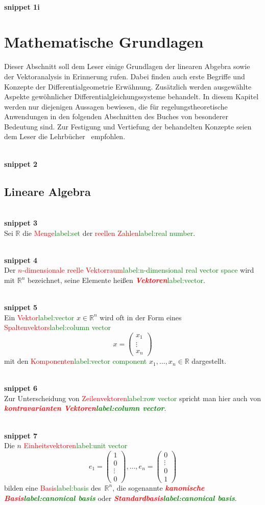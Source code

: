 \documentclass[a4paper,twoside,english,ngerman,deutsch,german,sectrefs,envcountsame,envcountchap]{svmono}
\newcommand{\setref}[2]{\textcolor{red}{#1}\textcolor{green}{#2}}
\newcommand{\snippet}[1]{\\\textbf{snippet #1}\\}
\begin{document}
\snippet{1i}

\chapter{Mathematische Grundlagen\label{cha:Grundlagen}}
Dieser Abschnitt soll dem Leser einige Grundlagen der linearen Abgebra sowie der Vektoranalysis in Erinnerung rufen. Dabei finden auch erste Begriffe und Konzepte der Differentialgeometrie Erwähnung. Zusätzlich werden ausgewählte Aspekte gewöhnlicher Differentialgleichungssysteme behandelt. In diesem Kapitel werden nur diejenigen Aussagen bewiesen, die für regelungstheoretische Anwendungen in den folgenden Abschnitten des Buches von besonderer Bedeutung sind. Zur Festigung und Vertiefung der behandelten Konzepte seien dem Leser die Lehrbücher~\cite{arnold2001,kerner2007} empfohlen.

\snippet{2}

\section{Lineare Algebra\label{sec:Lineare-Algebra}}

\snippet{3}
Sei ${\mathbb{R}}$ die \setref{Menge}{label:set} der \setref{reellen Zahlen}{label:real number}.

\snippet{4}
Der \setref{$n$-dimensionale reelle Vektorraum}{label:n-dimensional real vector space} wird mit ${\mathbb{R}}^{n}$ bezeichnet, seine Elemente heißen \setref{\textbf{\em Vektoren}}{label:vector}.

\snippet{5}
Ein \setref{Vektor}{label:vector} $x\in{\mathbb{R}}^{n}$ wird oft in der Form eines \setref{Spaltenvektors}{label:column vector}
\begin{equation}
x=\left(\begin{array}{c} x_{1}\\
\vdots\\
x_{n}
\end{array}\right)\label{eq:vektor-x}
\end{equation}
mit den \setref{Komponenten}{label:vector component} $x_{1},\ldots,x_{n}\in{\mathbb{R}}$ dargestellt.

\snippet{6}
Zur Unterscheidung von \setref{Zeilenvektoren}{label:row vector} spricht man hier auch von \textbf{\em \setref{kontravarianten Vektoren}{label:column vector}}.

\snippet{7}
Die $n$ \setref{Einheitsvektoren}{label:unit vector}
\[
e_{1}=\left(\begin{array}{c} 1\\ 0\\
\vdots\\
0
\end{array}\right),\ldots,e_{n}=\left(\begin{array}{c}
0\\
\vdots\\
0\\ 1
\end{array}\right)
\]
bilden eine \setref{Basis}{label:basis} des~${\mathbb{R}}^{n}$, die sogenannte \textbf{\em \setref{kanonische Basis}{label:canonical basis}} oder \textbf{\em \setref{Standardbasis}{label:canonical basis}}.
\end{document}
